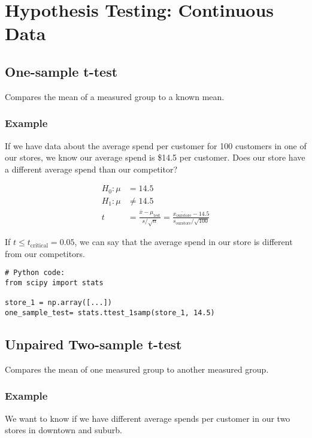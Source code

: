 \documentclass{article}
\theoremstyle{definition}
\theoremstyle{theorem}
\theoremstyle{theorem}
\theoremstyle{theorem}
\theoremstyle{theorem}
\theoremstyle{definition}
\theoremstyle{definition}
\theoremstyle{definition}
\theoremstyle{definition}
\theoremstyle{definition}
\begin{document}
\section{Hypothesis Testing: Continuous Data}

\subsection{One-sample t-test}
Compares the mean of a measured group to a known mean.

\subsubsection*{Example}

If we have data about the average spend per customer for 100 customers in one of our stores, we know our average spend is \$14.5 per customer. Does our store have a different average spend than our competitor?

\begin{align*}
    H_0: \mu &= 14.5 \\
    H_1: \mu &\neq 14.5 \\
    t &= \frac{\bar{x} - \mu_{\text{test}}}{s / \sqrt{n}} = \frac{\bar{x_{\text{ourstore}}} - 14.5}{s_{\text{ourstore}} / \sqrt{100}} 
\end{align*}

If \( t \leq t_{\text{critical}}=0.05 \), we can say that the average spend in our store is different from our competitors.

\lstset{language=Python}
\begin{lstlisting}
# Python code:
from scipy import stats

store_1 = np.array([...])
one_sample_test= stats.ttest_1samp(store_1, 14.5)
\end{lstlisting}

\subsection{Unpaired Two-sample t-test}
Compares the mean of one measured group to another measured group.

\subsubsection*{Example}

We want to know if we have different average spends per customer in our two stores in downtown and suburb.
\end{document}
